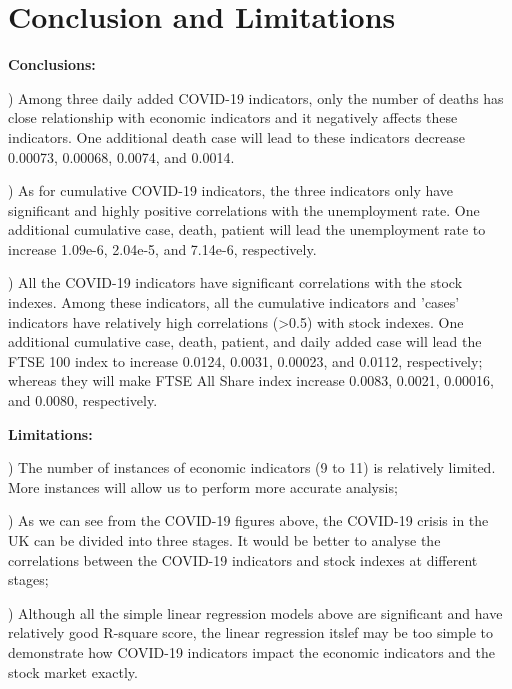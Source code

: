 \documentclass[12pt, a4paper]{report}
\begin{document}
\section{Conclusion and Limitations}
\textbf{Conclusions:}\par
{}) Among three daily added COVID-19 indicators, only the number of deaths has close
relationship with economic indicators and it negatively affects these indicators.
One additional death case will lead to these indicators decrease 0.00073, 0.00068, 0.0074, and 0.0014.\par
{}) As for cumulative COVID-19 indicators, the three indicators only have significant and highly positive correlations
with the unemployment rate. One additional cumulative case, death, patient will lead the unemployment rate to increase 1.09e-6, 2.04e-5, and 7.14e-6, respectively.\par
{}) All the COVID-19 indicators have significant correlations with the stock indexes. Among these indicators, all the cumulative indicators and 
'cases' indicators have relatively high correlations (>0.5) with stock indexes. One additional cumulative case, death, patient, and daily added case will lead the 
FTSE 100 index to increase 0.0124, 0.0031, 0.00023, and 0.0112, respectively; whereas they will make FTSE All Share index increase 0.0083, 0.0021, 0.00016, and 0.0080, 
respectively.\par

\hspace*{\fill}

\noindent
\textbf{Limitations:}\par
{}) The number of instances of economic indicators (9 to 11) is relatively limited. More instances will allow us to perform more accurate analysis;\par
{}) As we can see from the COVID-19 figures above, the COVID-19 crisis in the UK can be divided into three stages. It would be 
better to analyse the correlations between the COVID-19 indicators and stock indexes at different stages;\par
{}) Although all the simple linear regression models above are significant and have relatively good R-square score, the linear regression itslef may be 
too simple to demonstrate how COVID-19 indicators impact the economic indicators and the stock market exactly.\par
\end{document}
